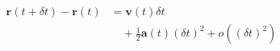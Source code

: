 \documentclass[border=2.5pt]{standalone}
\begin{document}
$\displaystyle \begin{aligned} \boldsymbol r(t+\delta t)-\boldsymbol r(t) &=\boldsymbol v(t)\delta t\\ &\quad+\tfrac12\boldsymbol a(t)(\delta t)^2+o((\delta t)^2) \end{aligned}$
\end{document}
